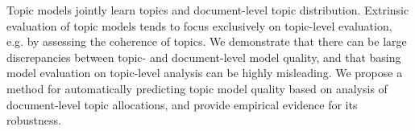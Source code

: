 Topic models jointly learn topics and document-level topic distribution.  Extrinsic evaluation of topic models tends to focus exclusively on topic-level evaluation, e.g. by assessing the coherence of topics. We demonstrate that there can be large discrepancies between topic- and document-level model quality, and that basing model evaluation on topic-level analysis can be highly misleading.  We propose a method for automatically predicting topic model quality based on analysis of document-level topic allocations, and provide empirical evidence for its robustness.

